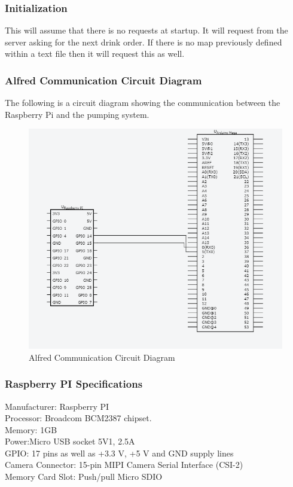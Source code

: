 \documentclass [10pt]{article}
\begin{document}
\subsubsection{Initialization}
This will assume that there is no requests at startup. It will request from the server asking for the next drink order. If there is no map previously defined within a text file then it will request this as well.

\subsubsection{Alfred Communication Circuit Diagram}
The following is a circuit diagram showing the communication between the Raspberry Pi and the pumping system.
\begin{figure} [h!]
	\centering
	\includegraphics [scale = 0.6] {Figures/UART.png}
	\caption{Alfred Communication Circuit Diagram}
\end{figure}

\subsubsection{Raspberry PI Specifications}
Manufacturer: Raspberry PI \\
Processor: Broadcom BCM2387 chipset. \\
Memory: 1GB \\
Power:Micro USB socket 5V1, 2.5A\\
GPIO: 17 pins as well as +3.3 V, +5 V and GND supply lines\\
Camera Connector: 15-pin MIPI Camera Serial Interface (CSI-2)\\
Memory Card Slot: Push/pull Micro SDIO\\
\end{document}
